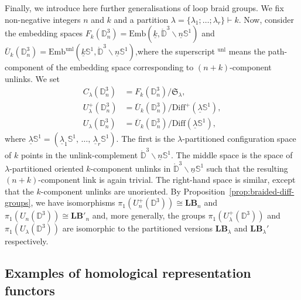 \documentclass[AHL,Unicode,published]{cedram}
\newcommand{\Emb}{\mathrm{Emb}}
\newcommand{\Diff}{\mathrm{Diff}}
\newcommand{\Int}{\mathring}
\newcommand{\runl}{\mathrm{unl}}
\newcommand{\lB}{\mathbf{LB}}
\newcommand{\Sym}{\mathfrak{S}}
\newcommand{\bD}{\mathbb{D}}
\newcommand{\bS}{\mathbb{S}}
\begin{document}
Finally, we introduce here further generalisations of loop braid groups. We fix non-negative integers $n$ and $k$ and a partition $\lambda = \boldsymbol{\{} \lambda_{1};\ldots;\lambda_{r} \boldsymbol{\}} \vdash k$. Now, consider the embedding spaces $F_{k}(\bD^{3}_{n}) = \Emb(\underline{k},\Int{\bD}^{3}\smallsetminus\underline{n}\bS^{1})$ and $\overline{U}_{k}(\bD^{3}_{n}) = \Emb^{\runl}(\underline{k}\bS^{1},\Int{\bD}^{3}\smallsetminus\underline{n}\bS^{1})$,\linebreak where the superscript ${}^{\runl}$ means the path-component of the embedding space corresponding to $(n+k)$-component unlinks. We set
\begin{equation}\label{eq:configurations_loop_braid_groups}
\begin{split}
C_{\lambda}\left(\bD^{3}_{n}\right) &= F_{k}\left(\bD^{3}_{n}\right) / \Sym_{\lambda},\\ U_{\lambda}^{+}\left(\bD^{3}_{n}\right) &= \overline{U}_{k}\left(\bD^{3}_{n}\right) / \Diff^{+}\left(\underline{\lambda}\bS^1\right),\\
 U_{\lambda}\left(\bD^{3}_{n}\right) &= \overline{U}_{k}\left(\bD^{3}_{n}\right) / \Diff\left(\underline{\lambda}\bS^1\right),
\end{split}
\end{equation}
where $\underline{\lambda}\bS^1=(\underline{\lambda}_{1}\bS^1,\,\ldots,\,\underline{\lambda}_{r}\bS^1)$. The first is the $\lambda$-partitioned configuration space of $k$ points in the unlink-complement $\Int{\bD}^{3}\smallsetminus\underline{n}\bS^{1}$. The middle space is the space of $\lambda$-partitioned oriented $k$-component unlinks in $\Int{\bD}^{3}\smallsetminus\underline{n}\bS^{1}$ such that the resulting $(n+k)$-component link is again trivial. The right-hand space is similar, except that the $k$-component unlinks are unoriented. By Proposition~\ref{prop:braided-diff-groups}, we have isomorphisms $\pi_{1}(U_{n}^{+}(\bD^{3})) \cong \lB_{n}$ and $\pi_{1}(U_{n}(\bD^{3})) \cong \lB'_{n}$ and, more generally, the groups $\pi_{1}(U_{\lambda}^{+}(\bD^{3}))$ and $\pi_{1}(U_{\lambda}(\bD^{3}))$ are isomorphic to the partitioned versions $\lB_{\lambda}$ and $\lB_{\lambda}'$ respectively.


\subsection{Examples of homological representation functors}\label{ss:examples}
\end{document}
